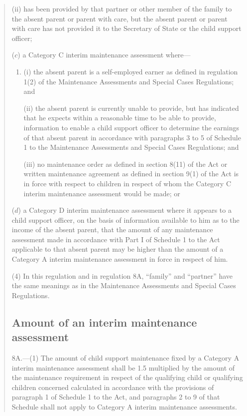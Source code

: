 \documentclass[a4paper]{article}
\begin{document}
\begin{quotation}
\begin{enumerate}
\begin{enumerate}
(ii) has been provided by that partner or other member of the family to the absent parent or parent with care, but the absent parent or parent with care has not provided it to the Secretary of State or the child support officer;
\end{enumerate}

($c$) a Category C interim maintenance assessment where—
\begin{enumerate}\item[]
(i) the absent parent is a self-employed earner as defined in regulation 1(2) of the Maintenance Assessments and Special Cases Regulations; and

(ii) the absent parent is currently unable to provide, but has indicated that he expects within a reasonable time to be able to provide, information to enable a child support officer to determine the earnings of that absent parent in accordance with paragraphs 3 to 5 of Schedule 1 to the Maintenance Assessments and Special Cases Regulations; and

(iii) no maintenance order as defined in section 8(11) of the Act or written maintenance agreement as defined in section 9(1) of the Act is in force with respect to children in respect of whom the Category C interim maintenance assessment would be made; or
\end{enumerate}

($d$) a Category D interim maintenance assessment where it appears to a child support officer, on the basis of information available to him as to the income of the absent parent, that the amount of any maintenance assessment made in accordance with Part I of Schedule 1 to the Act applicable to that absent parent may be higher than the amount of a Category A interim maintenance assessment in force in respect of him.
\end{enumerate}

(4) In this regulation and in regulation 8A, “family” and “partner” have the same meanings as in the Maintenance Assessments and Special Cases Regulations.

\subsection*{Amount of an interim maintenance assessment}

8A.—(1) The amount of child support maintenance fixed by a Category A interim maintenance assessment shall be 1.5 multiplied by the amount of the maintenance requirement in respect of the qualifying child or qualifying children concerned calculated in accordance with the provisions of paragraph 1 of Schedule 1 to the Act, and paragraphs 2 to 9 of that Schedule shall not apply to Category A interim maintenance assessments.


\end{quotation}
\end{document}
